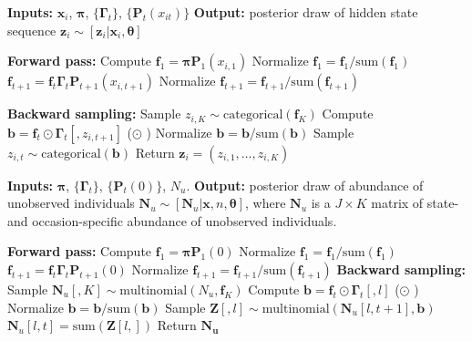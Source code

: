 \documentclass[11pt]{article}
\newcommand{\bx}{\ensuremath{\mathbf{x}}}
\newcommand{\bpi}{\ensuremath{\boldsymbol{\pi}}}
\newcommand{\bG}{\ensuremath{\boldsymbol{\Gamma}}}
\newcommand{\bt}{\ensuremath{\boldsymbol{\theta}}}
\begin{document}
\begin{algorithm}[H]
\caption{FFBS for Observed Individuals}
\begin{algorithmic}[1]
\STATE \textbf{Inputs:} $\bx_i$, $\bpi$, $\{\bG_t\}$, $\{\mathbf{P}_t(x_{it})\}$
\STATE \textbf{Output:} posterior draw of hidden state sequence $\mathbf{z}_i \sim [\mathbf{z}_i|\bx_i, \bt]$

\vspace{0.5em}
\STATE \textbf{Forward pass:}
\STATE Compute $\mathbf{f}_1 = \bpi \mathbf{P}_1(x_{i,1})$
\STATE Normalize $\mathbf{f}_{1} = \mathbf{f}_{1}/\text{sum}(\mathbf{f}_{1})$
    \STATE $\mathbf{f}_{t+1} = \mathbf{f}_{t} \bG_{t} \mathbf{P}_{t+1}(x_{i,t+1}) $
    \STATE Normalize $\mathbf{f}_{t+1} = \mathbf{f}_{t+1}/\text{sum}(\mathbf{f}_{t+1})$
\ENDFOR

\vspace{0.5em}
\STATE \textbf{Backward sampling:}
\STATE Sample $z_{i,K} \sim \text{categorical}(\mathbf{f}_K)$
    \STATE Compute $\mathbf{b} = \mathbf{f}_t \odot \bG_t[,z_{i,t+1}]$ ($\odot$ )
    \STATE Normalize $\mathbf{b} = \mathbf{b}/\text{sum}(\mathbf{b})$
     \STATE Sample $z_{i,t} \sim \text{categorical}(\mathbf{b})$
\ENDFOR
\STATE Return $\mathbf{z}_i=(z_{i,1},\dots,z_{i,K})$
\end{algorithmic}
\end{algorithm}

\begin{algorithm}[H]
\caption{Multinomial FFBS for Unobserved Individuals}
\begin{algorithmic}[1]
\STATE \textbf{Inputs:} $\bpi$, $\{\bG_t\}$, $\{\mathbf{P}_t(0)\}$, $N_u$.
\STATE \textbf{Output:} posterior draw of abundance of unobserved individuals $\mathbf{N}_{u} \sim [\mathbf{N}_{u}|\bx, n, \bt]$, where $\mathbf{N}_u$ is a $J\times K$ matrix of state- and occasion-specific abundance of unobserved individuals. 

\vspace{0.5em}
\STATE \textbf{Forward pass:}
\STATE Compute $\mathbf{f}_1 = \bpi \mathbf{P}_1(0)$
\STATE Normalize $\mathbf{f}_{1} = \mathbf{f}_{1}/\text{sum}(\mathbf{f}_{1})$
    \STATE $\mathbf{f}_{t+1} = \mathbf{f}_{t} \bG_{t} \mathbf{P}_{t+1}(0) $
    \STATE Normalize $\mathbf{f}_{t+1} = \mathbf{f}_{t+1}/\text{sum}(\mathbf{f}_{t+1})$
\ENDFOR
\vspace{0.5em}
\STATE \textbf{Backward sampling:}
\STATE Sample $\mathbf{N}_u[,K] \sim \text{multinomial}(N_u,\mathbf{f}_K)$
     \STATE Compute $\mathbf{b} = \mathbf{f}_t \odot \bG_t[,l]$ ($\odot$ )
     \STATE Normalize $\mathbf{b} = \mathbf{b}/\text{sum}(\mathbf{b})$
     \STATE Sample $\mathbf{Z}[,l] \sim \text{multinomial}(\mathbf{N}_u[l,t+1], \mathbf{b})$
    \ENDFOR
        \STATE $\mathbf{N}_u[l,t] = \text{sum}(\mathbf{Z}[l,])$
    \ENDFOR
\ENDFOR
\STATE Return $\mathbf{\mathbf{N}_u}$
\end{algorithmic}
\end{algorithm}
\end{document}
